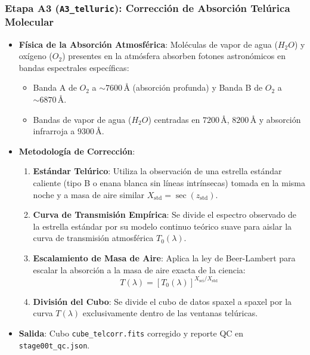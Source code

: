 \documentclass[11pt,a4paper]{article}
\begin{document}
\subsubsection{Etapa A3 (\texttt{A3\_telluric}): Corrección de Absorción Telúrica Molecular}
\begin{itemize}[leftmargin=1.0cm]
    \item \textbf{Física de la Absorción Atmosférica}: Moléculas de vapor de agua ($H_2O$) y oxígeno ($O_2$) presentes en la atmósfera absorben fotones astronómicos en bandas espectrales específicas:
    \begin{itemize}
        \item Banda A de $O_2$ a $\sim 7600\,\text{\AA}$ (absorción profunda) y Banda B de $O_2$ a $\sim 6870\,\text{\AA}$.
        \item Bandas de vapor de agua ($H_2O$) centradas en $7200\,\text{\AA}$, $8200\,\text{\AA}$ y absorción infrarroja a $9300\,\text{\AA}$.
    \end{itemize}
    \item \textbf{Metodología de Corrección}:
    \begin{enumerate}
        \item \textbf{Estándar Telúrico}: Utiliza la observación de una estrella estándar caliente (tipo B o enana blanca sin líneas intrínsecas) tomada en la misma noche y a masa de aire similar $X_\text{std} = \sec(z_\text{std})$.
        \item \textbf{Curva de Transmisión Empírica}: Se divide el espectro observado de la estrella estándar por su modelo continuo teórico suave para aislar la curva de transmisión atmosférica $T_0(\lambda)$.
        \item \textbf{Escalamiento de Masa de Aire}: Aplica la ley de Beer-Lambert para escalar la absorción a la masa de aire exacta de la ciencia:
        $$T(\lambda) = \left[ T_0(\lambda) \right]^{X_\text{sci} / X_\text{std}}$$
        \item \textbf{División del Cubo}: Se divide el cubo de datos spaxel a spaxel por la curva $T(\lambda)$ exclusivamente dentro de las ventanas telúricas.
    \end{enumerate}
    \item \textbf{Salida}: Cubo \texttt{cube\_telcorr.fits} corregido y reporte QC en \texttt{stage00t\_qc.json}.
\end{itemize}
\end{document}
